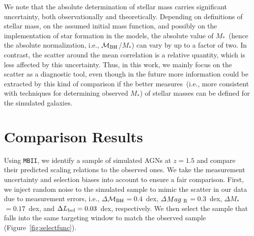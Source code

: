 \documentclass[twocolumn,trackchanges]{aastex63}
\newcommand{\mbh}{$\mathcal M_{\rm BH}$}
\newcommand{\mr}{$Mag_{\rm ~R}$}
\newcommand{\mstar}{{$M_*$}}
\newcommand{\mbii}{\texttt{MBII}}
\begin{document}
We note that the absolute determination of stellar mass carries significant uncertainty, both observationally and theoretically. Depending on definitions of stellar mass, on the assumed initial mass function, and possibly on the implementation of star formation in the models, the absolute value of \mstar\ (hence the absolute normalization, i.e., \mbh/\mstar) can vary by up to a factor of two. In contrast, the scatter around the mean correlation is a relative quantity, which is less affected by this uncertainty. Thus, in this work, we mainly focus on the scatter as a diagnostic tool, even though in the future more information could be extracted by this kind of comparison if the %
better measures~(i.e., more consistent with techniques for determining observed \mstar) of stellar masses can be defined for the simulated galaxies.

\section{Comparison Results}
\label{sec:result}
Using \mbii, we identify a sample of simulated AGNs at $z=1.5$ and compare their predicted scaling relations to the observed ones. We take the measurement uncertainty and selection biases into account to ensure a fair comparison. First, we inject random noise to the simulated sample to mimic the scatter in our data due to measurement errors, i.e., $\Delta$\mbh $=0.4$~dex, $\Delta$\mr$=0.3$~dex, $\Delta$\mstar$=0.17$~dex, and $\Delta L_{\rm bol}=0.03$~dex, respectively. We then select the sample that falls into the same targeting window to match the observed sample (Figure~\ref{fig:selectfunc}). 
\end{document}
